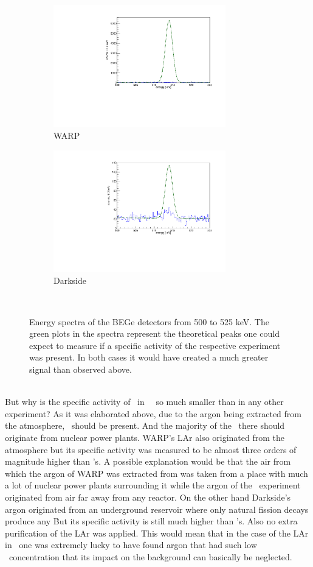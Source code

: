 \documentclass[encoding=utf8,british]{tumphthesis}
\begin{document}
\begin{figure}[t!]
	\centering
	\begin{subfigure}{.5\textwidth}
		\centering
		\includegraphics[width=75mm]{./Bilder/WARP.pdf}
		\caption{WARP}
		\label{fig:WARP}
	\end{subfigure}\hfill%
	\begin{subfigure}{.5\textwidth}
		\centering
		\includegraphics[width=75mm]{./Bilder/Darkside.pdf}
		\caption{Darkside}
		\label{fig:Darkside}
	\end{subfigure}
    \\
    \caption{
    	Energy spectra of the BEGe detectors from 500 to 525 keV.
    	The green plots in the spectra represent the theoretical peaks one could expect to measure if a specific activity of the respective experiment was present.
    	In both cases it would have created a much greater signal than observed above.
    	}
\end{figure}
\\

But why is the specific activity of \Kr\ in \gerda\ \PII\ so much smaller than in any other experiment?
As it was elaborated above, due to the argon being extracted from the atmosphere, \Kr\ should be present.
And the majority of the \Kr\ there should originate from nuclear power plants.
WARP's LAr also originated from the atmosphere but its specific activity was measured to be almost three orders of magnitude higher than \gerda's.
A possible explanation would be that the air from which the argon of WARP was extracted from was taken from a place with much a lot of nuclear power plants surrounding it while the argon of the \gerda\ experiment originated from air far away from any reactor.
On the other hand Darkside's argon originated from an underground reservoir where only natural fission decays produce any \Kr\.
But its specific activity is still much higher than \gerda's.
Also no extra purification of the LAr was applied.
This would mean that in the case of the LAr in \gerda\ one was extremely lucky to have found argon that had such low \Kr\ concentration that its impact on the background can basically be neglected.
\\
\end{document}
